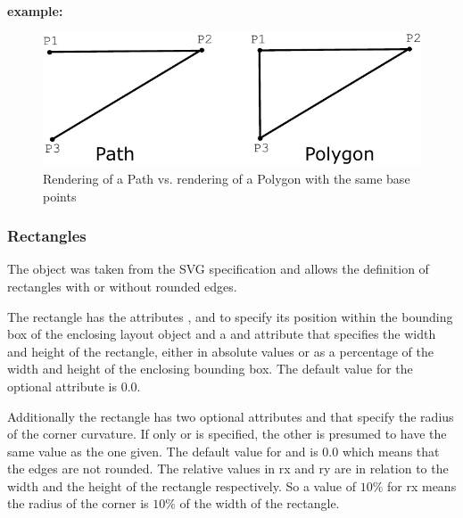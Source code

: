 \vspace{0.25cm}
{\large
{\bf
example:
}
}

{\footnotesize
{}
}


\begin{figure}[!ht]
\begin{center}
\includegraphics[scale=0.10]{figures/PathVsPolygon}
\end{center}
\caption{Rendering of a Path vs. rendering of a Polygon with the same base points}
\label{PathVsPolygon}
\end{figure}


\subsubsection{Rectangles}
\label{rectangle-class}
The \RenderRectangle object was taken from the SVG specification and allows the definition of 
rectangles with or without rounded edges. 

The rectangle has the attributes 
,  and  to specify its position within the 
bounding box of the enclosing layout object and a  and 
 attribute that specifies the width and height of the rectangle, 
either in absolute values or as a percentage of the width and height of the 
enclosing bounding box. The default value for the optional  attribute 
is $0.0$.

Additionally the rectangle has two optional attributes  and
 that specify the radius of the corner curvature. If only  or  
is specified, the other is presumed to have the same value as the one given. The default value 
for  and  is $0.0$ which means that the edges are not rounded.
The relative values in rx and ry are in relation to the width and the height of the rectangle respectively.
So a value of $10\%$ for rx means the radius of the corner is $10\%$ of the width of the rectangle. 

